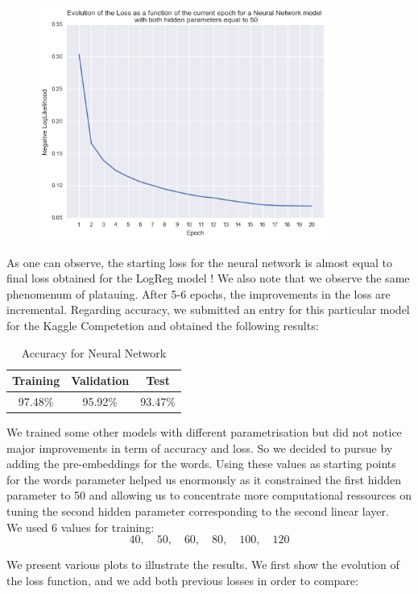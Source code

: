 \documentclass[11pt]{article}
\begin{document}
\begin{figure}[H]
\centering
\includegraphics[width=9.5cm]{nn1}
\end{figure}

\noindent As one can observe, the starting loss for the neural network is almost equal to final loss obtained for the LogReg model ! We also note that we observe the same phenomenum of platauing. After 5-6 epochs, the improvements in the loss are incremental. Regarding accuracy, we submitted an entry for this particular model for the Kaggle Competetion and obtained the following results:

\begin{table}[H]
\centering
\label{my-label2}
\begin{tabular}{|c|c|c|}
\hline
Training & Validation & Test    \\ \hline
97.48\%  & 95.92\%    & 93.47\% \\ \hline
\end{tabular}
\caption{Accuracy for Neural Network}
\end{table}

\noindent We trained some other models with different parametrisation but did not notice major improvements in term of accuracy and loss. So we decided to pursue by adding the pre-embeddings for the words. Using these values as starting points for the words parameter helped us enormously as it constrained the first hidden parameter to 50 and allowing us to concentrate more computational ressources on tuning the second hidden parameter corresponding to the second linear layer.\\

\noindent We used 6 values for training: $$40, \quad 50, \quad 60, \quad 80, \quad 100, \quad 120$$

\noindent We present various plots to illustrate the results. We first show the evolution of the loss function, and we add both previous losses in order to compare:
\end{document}
